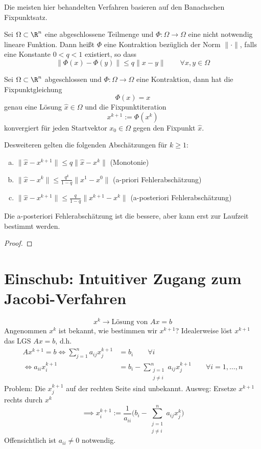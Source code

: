 \documentclass{mycourse}
\begin{document}
Die meisten hier behandelten Verfahren basieren auf den Banachschen Fixpunktsatz.

\begin{df}[Kontraktion]
	\label{df:4.1}
	Sei $\Omega \subset \R^n$ eine abgeschlossene Teilmenge und $\Phi: \Omega \to \Omega$ eine nicht notwendig lineare Funktion.
	Dann heißt $\Phi$ eine Kontraktion bezüglich der Norm $\|\cdot\|$, falls eine Konstante $0<q<1$ existiert, so dass
	\[
		\|\Phi(x) - \Phi(y)\| \le q \|x-y\| \qquad \forall x,y\in \Omega
	\]
\end{df}

\begin{st}
	\label{st:4.2}
	Sei $\Omega \subset \R^n$ abgeschlossen und $\Phi: \Omega \to \Omega$ eine Kontraktion, dann hat die Fixpunktgleichung
	\[
		\Phi(x) = x
	\]
	genau eine Lösung $\hat x\in \Omega$ und die Fixpunktiteration
	\[
		x^{k+1} := \Phi(x^k)
	\]
	konvergiert für jeden Startvektor $x_0\in \Omega$ gegen den Fixpunkt $\hat x$.

	Desweiteren gelten die folgenden Abschätzungen für $k\ge 1$:
	\begin{enumerate}[a)]
		\item
			$\|\hat x-x^{k+1}\| \le q\|\hat x - x^k\|$ (Monotonie)
		\item
			$\|\hat x - x^{k}\| \le \frac {q^k}{1-q} \|x^1-x^0\|$ (a-priori Fehlerabschätzung)
		\item
			$\|\hat x - x^{k+1}\| \le \frac{q}{1-q} \|x^{k+1}-x^k\|$ (a-posteriori Fehlerabschätzung) 
	\end{enumerate}

	\begin{note}
		Die a-posteriori Fehlerabschätzung ist die bessere, aber kann erst zur Laufzeit bestimmt werden.
	\end{note}

	\begin{proof}
	\end{proof}
\end{st}


\section*{Einschub: Intuitiver Zugang zum Jacobi-Verfahren}

\[
	x^k \to \text{Lösung von $Ax=b$}
\]
Angenommen $x^k$ ist bekannt, wie bestimmen wir $x^{k+1}$?
Idealerweise löst $x^{k+1}$ das LGS $Ax=b$, d.h.
\begin{align*}
	Ax^{k+1} = b \iff \sum_{j=1}^n a_{ij}x_j^{k+1} &= b_i \qquad \forall i \\
	\iff a_{ii} x_i^{k+1} &= b_i - \sum_{\substack{j=1\\j\neq i}}^n a_{ij} x_j^{k+1} \qquad \forall i=1,\dotsc,n
\end{align*}
Problem: Die $x_j^{k+1}$ auf der rechten Seite sind unbekannt.
Ausweg: Ersetze $x^{k+1}$ rechts durch $x^k$
\[
	\implies x_i^{k+1} := \frac 1{a_{ii}} \bigg( b_i - \sum_{\substack{j=1\\j\neq i}}^n a_{ij}x_j^k\bigg)
\]
Offensichtlich ist $a_{ii}\neq 0$ notwendig.
\end{document}
